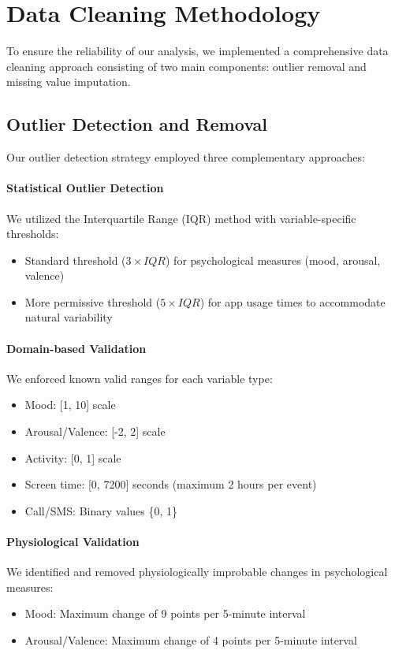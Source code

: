 \section{Data Cleaning Methodology}
To ensure the reliability of our analysis, we implemented a comprehensive data cleaning approach consisting of two main components: outlier removal and missing value imputation.

\subsection{Outlier Detection and Removal}
Our outlier detection strategy employed three complementary approaches:

\paragraph{Statistical Outlier Detection}
We utilized the Interquartile Range (IQR) method with variable-specific thresholds:
\begin{itemize}
    \item Standard threshold ($3 \times IQR$) for psychological measures (mood, arousal, valence)
    \item More permissive threshold ($5 \times IQR$) for app usage times to accommodate natural variability
\end{itemize}

\paragraph{Domain-based Validation}
We enforced known valid ranges for each variable type:
\begin{itemize}
    \item Mood: [1, 10] scale
    \item Arousal/Valence: [-2, 2] scale
    \item Activity: [0, 1] scale
    \item Screen time: [0, 7200] seconds (maximum 2 hours per event)
    \item Call/SMS: Binary values \{0, 1\}
\end{itemize}

\paragraph{Physiological Validation}
We identified and removed physiologically improbable changes in psychological measures:
\begin{itemize}
    \item Mood: Maximum change of 9 points per 5-minute interval
    \item Arousal/Valence: Maximum change of 4 points per 5-minute interval
\end{itemize}

